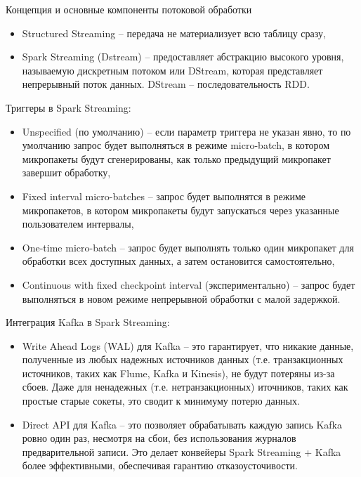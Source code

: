 \documentclass[%
	11pt,
	a4paper,
	utf8,
		]{article}
\begin{document}
Концепция и основные компоненты потоковой обработки
\begin{itemize}
	\item Structured Streaming -- передача не материализует всю таблицу сразу,
	
	\item Spark Streaming (Dstream) -- предоставляет абстракцию высокого уровня, называемую дискретным потоком или DStream, которая представляет непрерывный поток данных. DStream -- последовательность RDD.
\end{itemize}

Триггеры в Spark Streaming:
\begin{itemize}
	\item Unspecified (по умолчанию) -- если параметр триггера не указан явно, то по умолчанию запрос будет выполняться в режиме micro-batch, в котором микропакеты будут сгенерированы, как только предыдущий микропакет завершит обработку,
	
	\item Fixed interval micro-batches -- запрос будет выполнятся в режиме микропакетов, в котором микропакеты будут запускаться через указанные пользователем интервалы,
	
	\item One-time micro-batch -- запрос будет выполнять только один микропакет для обработки всех доступных данных, а затем остановится самостоятельно,
	
	\item Continuous with fixed checkpoint interval (экспериментально) -- запрос будет выполняться в новом режиме непрерывной обработки с малой задержкой.
\end{itemize}

Интеграция Kafka в Spark Streaming:
\begin{itemize}
	\item Write Ahead Logs (WAL) для Kafka -- это гарантирует, что никакие данные, полученные из любых надежных источников данных (т.е. транзакционных источников, таких как Flume, Kafka и Kinesis), не будут потеряны из-за сбоев. Даже для ненадежных (т.е. нетранзакционных) иточников, таких как простые старые сокеты, это сводит к минимуму потерю данных.
	
	\item Direct API для Kafka -- это позволяет обрабатывать каждую запись Kafka ровно один раз, несмотря на сбои, без использования журналов предварительной записи. Это делает конвейеры Spark Streaming + Kafka более эффективными, обеспечивая гарантию отказоусточивости.
\end{itemize}
\end{document}
